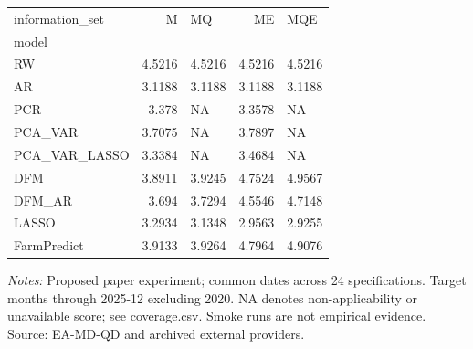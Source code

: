 \begin{threeparttable}
\begin{tabular}{lrlrl}
\toprule
information\_set & M & MQ & ME & MQE \\
model &  &  &  &  \\
\midrule
RW & 4.5216 & 4.5216 & 4.5216 & 4.5216 \\
AR & 3.1188 & 3.1188 & 3.1188 & 3.1188 \\
PCR & 3.378 & NA & 3.3578 & NA \\
PCA\_VAR & 3.7075 & NA & 3.7897 & NA \\
PCA\_VAR\_LASSO & 3.3384 & NA & 3.4684 & NA \\
DFM & 3.8911 & 3.9245 & 4.7524 & 4.9567 \\
DFM\_AR & 3.694 & 3.7294 & 4.5546 & 4.7148 \\
LASSO & 3.2934 & 3.1348 & 2.9563 & 2.9255 \\
FarmPredict & 3.9133 & 3.9264 & 4.7964 & 4.9076 \\
\bottomrule
\end{tabular}
\begin{tablenotes}[flushleft]\footnotesize
\item \textit{Notes:} Proposed paper experiment; common dates across 24 specifications. Target months through 2025-12 excluding 2020. NA denotes non-applicability or unavailable score; see coverage.csv. Smoke runs are not empirical evidence. Source: EA-MD-QD and archived external providers.
\end{tablenotes}
\end{threeparttable}
